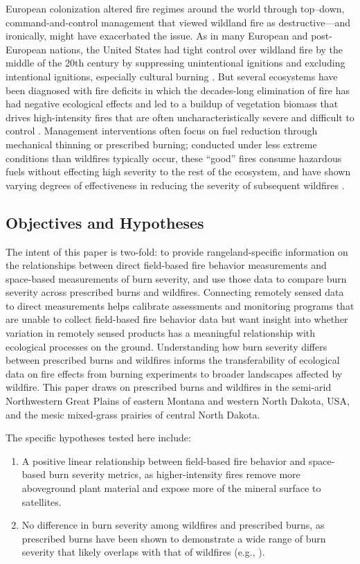 \documentclass[fire,article,accept,oneauthor,pdftex]{Definitions/mdpi}
\begin{document}
European colonization altered fire regimes around the world through top--down, command-and-control management that viewed wildland fire as destructive---and ironically, might have exacerbated the issue. 
As in many European and post-European nations, the United States had tight control over wildland fire by the middle of the 20th century by suppressing unintentional ignitions and excluding intentional ignitions, especially cultural burning \cite{mcgranahan2021a, donovan2007}. 
But several ecosystems have been diagnosed with fire deficits in which the decades-long elimination of fire has had negative ecological effects and led to a buildup of vegetation biomass that drives high-intensity fires that are often uncharacteristically severe and difficult to control \cite{parks2015,kolden2019}. 
Management interventions often focus on fuel reduction through mechanical thinning or prescribed burning; conducted under less extreme conditions than wildfires typically occur, these ``good'' fires consume hazardous fuels without effecting high severity to the rest of the ecosystem, and have shown varying degrees of effectiveness in reducing the severity of subsequent wildfires \cite{fernandes2003, brodie2024}. 

\subsection{Objectives and Hypotheses} 

The intent of this paper is two-fold: to provide rangeland-specific information on the relationships between direct field-based fire behavior measurements and space-based measurements of burn severity, and use those data to compare burn severity across prescribed burns and wildfires. 
Connecting remotely sensed data to direct measurements helps calibrate assessments and monitoring programs that are unable to collect field-based fire behavior data but want insight into whether variation in remotely sensed products has a meaningful relationship with ecological processes on the ground. 
Understanding how burn severity differs between prescribed burns and wildfires informs the transferability of ecological data on fire effects from burning experiments to broader landscapes affected by wildfire.
This paper draws on prescribed burns and wildfires in the semi-arid Northwestern Great Plains of eastern Montana and western North Dakota, USA, and the mesic mixed-grass prairies of central North Dakota.

The specific hypotheses tested here include: 
\begin{enumerate}[leftmargin=*,labelsep=4.9mm] 
	\item A positive linear relationship between field-based fire behavior and space-based burn severity metrics, as higher-intensity fires remove more aboveground plant material and expose more of the mineral surface to satellites.
	\item No difference in burn severity among wildfires and prescribed burns, as prescribed burns have been shown to demonstrate a wide range of burn severity that likely overlaps with that of wildfires (e.g., \cite{mcgranahan2025}). 
\end{enumerate}
\end{document}
